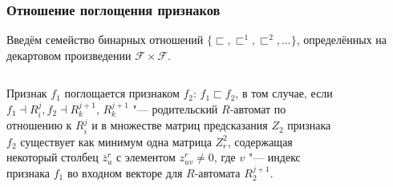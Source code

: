\documentclass[default]{beamer}
\begin{document}
	\begin{frame}
		\frametitle{Отношение поглощения признаков}
		Введём семейство бинарных отношений $\{\sqsubset,\sqsubset^1,\sqsubset^2,\dots\}$, определённых на декартовом произведении $\mathcal F\times\mathcal F$. 
		\par\bigskip
		\begin{columns}
			\begin{column}{0.6\textwidth}
				Признак $f_1$ поглощается признаком $f_2$: $f_1\sqsubset f_2$, в том случае, если $f_1\dashv R_i^j, f_2\dashv R_k^{j+1}$, $R_k^{j+1}$ "--- родительский $R$-автомат по отношению к $R_i^j$ и в множестве матриц предсказания $Z_2$ признака $f_2$ существует как минимум одна матрица $Z_r^2$, содержащая некоторый столбец $\bar z_u^r$ с элементом $z_{uv}^r\not=0$, где $v$ "--- индекс признака $f_1$ во входном векторе для $R$-автомата $R_2^{j+1}$.
			\end{column}
			\begin{column}{0.4\textwidth}
				\begin{figure}[t]
					\includegraphics[width=0.75\linewidth]{automata/meas}
				\end{figure}
			\end{column}
		\end{columns}
	\end{frame}
	
\end{document}

